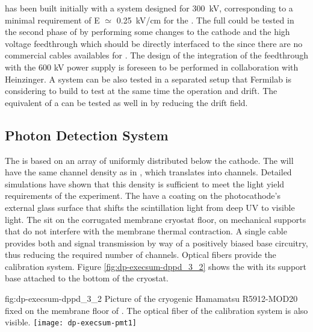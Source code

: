   has been built initially with a   system designed for \SI{300}{kV}, corresponding to a minimal requirement of E ${\simeq}$ \SI{0.25}{kV/cm} for the . The full  \dptargetdriftvoltpos could be tested in the second phase of   by performing some changes to the cathode and the high voltage feedthrough which should be directly interfaced to the    since there are no commercial cables availables for \dptargetdriftvoltpos. The design of the integration of the   feedthrough with the 600 kV power supply is foreseen to be performed in collaboration with Heinzinger. A \dptargetdriftvoltpos  {} system can be also tested in a separated setup that Fermilab is considering to build to test at the same time the \dptargetdriftvoltpos operation and \dpmaxdrift drift. The equivalent of a \dpmaxdrift can be tested as well in   by reducing the drift field.




\subsection{Photon Detection System}
\label{sec:dp-execsum-pd}

The  is based on an array of  uniformly distributed below the cathode. 
The   will have the same  channel density as in , which translates into \dpnumpmtch channels. Detailed simulations have shown that this density is sufficient to meet the light yield requirements of the
experiment. 
The  have a  coating on the photocathode's external glass surface that shifts the scintillation light from deep UV to visible light. The   sit on the corrugated membrane cryostat floor, on 
mechanical supports that do not interfere with the membrane thermal contraction. 
A single cable provides both  and signal transmission by way of a positively biased base circuitry, thus reducing the required number of \fdth{} channels. Optical fibers provide the calibration system.   Figure \ref{fig:dp-execsum-dppd_3_2} shows the  with its support base attached to the bottom of the  cryostat.

\begin{dunefigure}{fig:dp-execsum-dppd_3_2}
{Picture of the cryogenic Hamamatsu R5912-MOD20  fixed on the membrane floor of . The optical fiber of the calibration system is also visible.}
\texttt{[image: dp-execsum-pmt1]}
\end{dunefigure}

